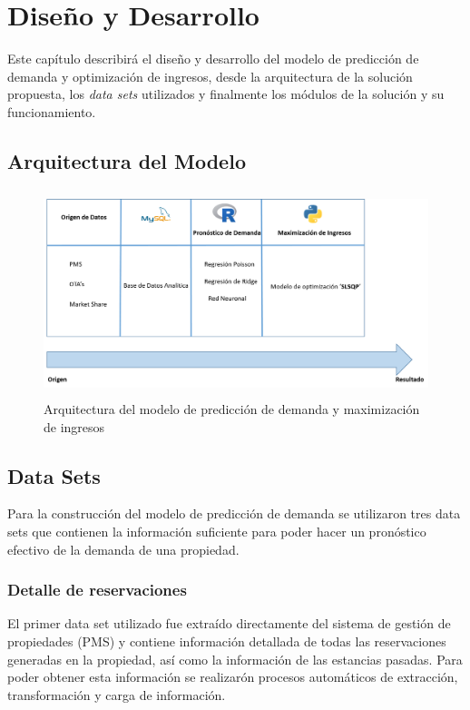\chapter{Diseño y Desarrollo}
\label{ch:modelo}

Este capítulo describirá el diseño y desarrollo del modelo de predicción de demanda y optimización de ingresos, desde la arquitectura de la solución propuesta, los \emph{data sets} utilizados y finalmente los módulos de la solución y su funcionamiento.

\section*{Arquitectura del Modelo}

\begin{figure}[H]
  \centering
      \includegraphics[width=\maxwidth,height=6cm]{figures/Arquitectura.png}  
  \caption{Arquitectura del modelo de predicción de demanda y maximización de ingresos}
\end{figure}



\section*{Data Sets}
Para la construcción del modelo de predicción de demanda se utilizaron tres data sets que contienen la información suficiente para poder hacer un pronóstico efectivo de la demanda de una propiedad.

\subsection*{Detalle de reservaciones}


El primer data set utilizado fue extraído directamente del sistema de gestión de propiedades (PMS) y contiene información detallada de todas las reservaciones generadas en la propiedad, así como la información de las estancias pasadas. Para poder obtener esta información se realizarón procesos automáticos de extracción, transformación y carga de información. 

